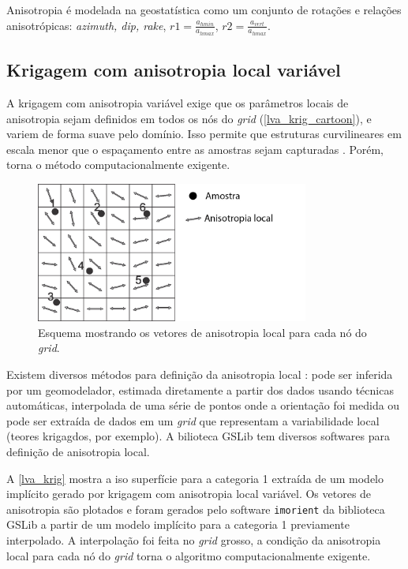 Anisotropia é modelada na geostatística como um conjunto de rotações e relações anisotrópicas: \textit{azimuth, dip, rake}, $r1 = \frac{a_{hmin}}{a_{hmax}}$, $r2 = \frac{a_{vert}}{a_{hmax}}$. 

\subsection{Krigagem com anisotropia local variável}

A krigagem com anisotropia variável exige que os parâmetros locais de anisotropia sejam definidos em todos os nós do \textit{grid} (\autoref{lva_krig_cartoon}), e variem de forma suave pelo domínio. Isso permite que estruturas curvilineares em escala menor que o espaçamento entre as amostras sejam capturadas \cite{martin2017implicitmodeling}. Porém, torna o método computacionalmente exigente.

\begin{figure}[H]
\caption{\label{lva_krig_cartoon}Esquema mostrando os vetores de anisotropia local para cada nó do \textit{grid}.}
	\begin{center}
		\includegraphics[width=0.8\textwidth]{capitulo_2/lvakrig1.jpg}
	\end{center}
\end{figure}

Existem diversos métodos para definição da anisotropia local \cite{lillah2015inference}: pode ser inferida por um geomodelador, estimada diretamente a partir dos dados usando técnicas automáticas, interpolada de uma série de pontos onde a orientação foi medida ou pode ser extraída de dados em um \textit{grid} que representam a variabilidade local (teores krigagdos, por exemplo). A bilioteca GSLib tem diversos softwares para definição de anisotropia local. 

A \autoref{lva_krig} mostra a iso superfície para a categoria 1 extraída de um modelo implícito gerado por krigagem com anisotropia local variável. Os vetores de anisotropia são plotados e foram gerados pelo software \verb|imorient| da biblioteca GSLib a partir de um modelo implícito para a categoria 1 previamente interpolado. A interpolação foi feita no \textit{grid} grosso, a condição da anisotropia local para cada nó do \textit{grid} torna o algoritmo computacionalmente exigente.

